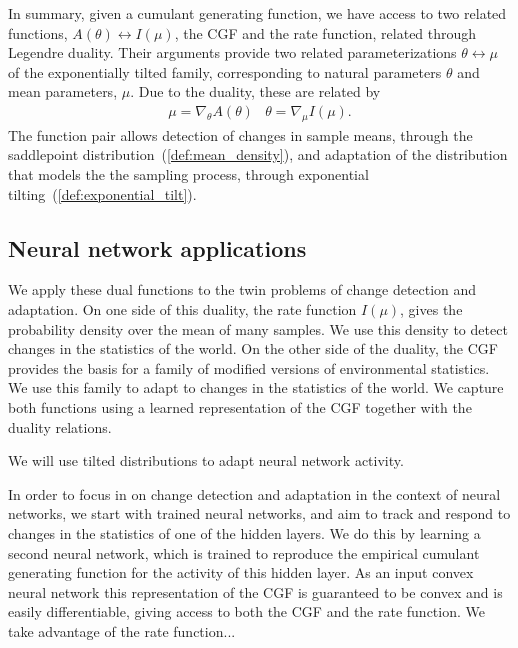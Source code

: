 \documentclass[11pt]{article}      %
\begin{document}
In summary, given a cumulant generating function, we have access to two related functions, $A(\theta) \leftrightarrow I(\mu)$, the CGF and the rate function, related through Legendre duality.
Their arguments provide two related parameterizations $\theta \leftrightarrow \mu$ of the exponentially tilted family, corresponding to natural parameters $\theta$ and mean parameters, $\mu$.
Due to the duality, these are related by 
\begin{eqnarray}
  \mu = \nabla_\theta A(\theta) & \theta = \nabla_\mu I(\mu). \label{eq:duality_relations}
\end{eqnarray}
The function pair allows detection of changes in sample means, through the saddlepoint distribution~(\ref{def:mean_density}), and adaptation of the distribution that models the the sampling process, through exponential tilting~(\ref{def:exponential_tilt}).


\subsection{Neural network applications}

We apply these dual functions to the twin problems of change detection and adaptation.
On one side of this duality, the rate function $I(\mu)$, gives the probability density over the mean of many samples.
We use this density to detect changes in the statistics of the world.
On the other side of the duality, the CGF provides the basis for a family of modified versions of environmental statistics.
We use this family to adapt to changes in the statistics of the world.
We capture both functions using a learned representation of the CGF together with the duality relations.



We will use tilted distributions to adapt neural network activity.



In order to focus in on change detection and adaptation in the context of neural networks, we start with trained neural networks, and aim to track and respond to changes in the statistics of one of the hidden layers. 
We do this by learning a second neural network, which is trained to reproduce the empirical cumulant generating function for the activity of this hidden layer.
As an input convex neural network \cite{amos_input_2017} this representation of the CGF is guaranteed to be convex and is easily differentiable, giving access to both the CGF and the rate function.
We take advantage of the rate function...
\end{document}
